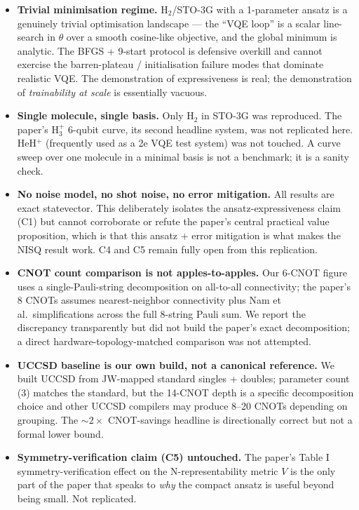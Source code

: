 \documentclass[11pt]{article}
\begin{document}
\begin{itemize}
\item \textbf{Trivial minimisation regime.} H$_2$/STO-3G with a 1-parameter ansatz
is a genuinely trivial optimisation landscape --- the ``VQE loop'' is a scalar
line-search in $\theta$ over a smooth cosine-like objective, and the global
minimum is analytic. The BFGS + 9-start protocol is defensive overkill and
cannot exercise the barren-plateau / initialisation failure modes that dominate
realistic VQE. The demonstration of expressiveness is real; the demonstration
of \emph{trainability at scale} is essentially vacuous.

\item \textbf{Single molecule, single basis.} Only H$_2$ in STO-3G was reproduced.
The paper's H$_3^+$ 6-qubit curve, its second headline system, was not replicated
here. HeH$^+$ (frequently used as a 2e VQE test system) was not touched. A curve
sweep over one molecule in a minimal basis is not a benchmark; it is a sanity
check.

\item \textbf{No noise model, no shot noise, no error mitigation.} All results
are exact statevector. This deliberately isolates the ansatz-expressiveness
claim (C1) but cannot corroborate or refute the paper's central practical value
proposition, which is that this ansatz + error mitigation is what makes the
NISQ result work. C4 and C5 remain fully open from this replication.

\item \textbf{CNOT count comparison is not apples-to-apples.} Our 6-CNOT figure
uses a single-Pauli-string decomposition on all-to-all connectivity;
the paper's 8 CNOTs assumes nearest-neighbor connectivity plus Nam et al.\
simplifications across the full 8-string Pauli sum. We report the discrepancy
transparently but did not build the paper's exact decomposition; a direct
hardware-topology-matched comparison was not attempted.

\item \textbf{UCCSD baseline is our own build, not a canonical reference.}
We built UCCSD from JW-mapped standard singles + doubles; parameter count (3)
matches the standard, but the 14-CNOT depth is a specific decomposition choice
and other UCCSD compilers may produce 8--20 CNOTs depending on grouping.
The $\sim2\times$ CNOT-savings headline is directionally correct but not a
formal lower bound.

\item \textbf{Symmetry-verification claim (C5) untouched.} The paper's Table I
symmetry-verification effect on the N-representability metric $V$ is the only
part of the paper that speaks to \emph{why} the compact ansatz is useful beyond
being small. Not replicated.


\end{itemize}
\end{document}
